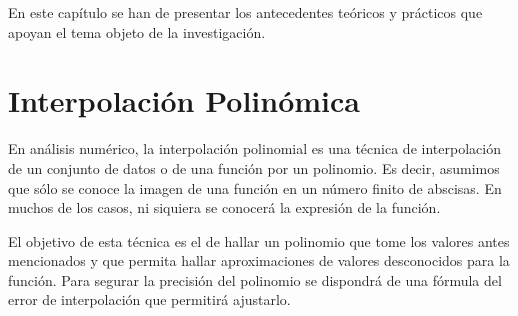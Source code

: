 

En este capítulo se han de presentar los antecedentes teóricos y prácticos que
apoyan el tema objeto de la investigación.


\section{Interpolación Polinómica}
\label{2:sec:1}
En análisis numérico, la interpolación polinomial es una técnica de interpolación de un conjunto de datos o de una función por un polinomio. Es decir, asumimos que sólo se conoce la imagen de una función en un número finito de abscisas. En muchos de los casos, ni siquiera se conocerá la expresión de la función.\par El objetivo de esta técnica es el de hallar un polinomio que tome los valores antes mencionados y que permita hallar aproximaciones de valores desconocidos para la función. Para segurar la precisión del polinomio se dispondrá de una fórmula del error de interpolación que permitirá ajustarlo.

